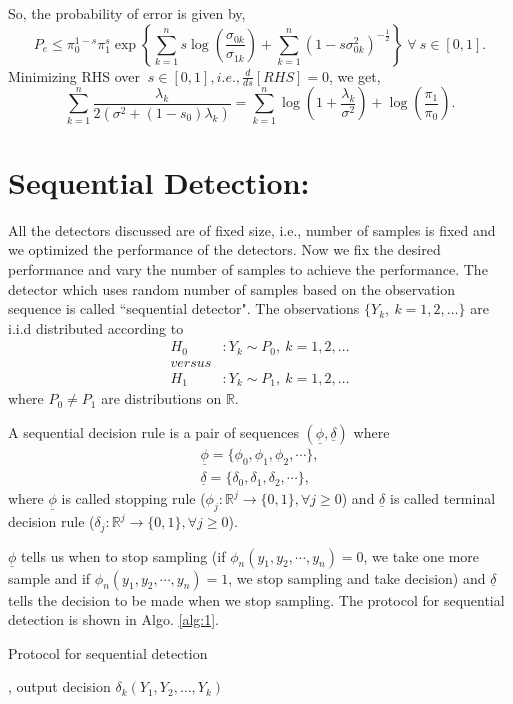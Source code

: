 \documentclass[a4paper,english,12pt]{article}
\newcommand{\uphi}{\underline{\phi}}
\newcommand{\udel}{\underline{\delta}}
\begin{document}
So, the probability of error is given by,
\begin{equation}
P_e \leq \pi_0^{1-s}\pi_1^{s}\exp\left\lbrace\sum_{k=1}^{n}s\log\left(\frac{\sigma_{0k}}{\sigma_{1k}} \right) + \sum_{k=1}^{n}\left( 1-s\sigma_{0k}^2\right)^{-\frac{1}{2}} \right\rbrace \;\forall \:s\in\left[ 0,1\right].
\end{equation}
Minimizing RHS over $\:s\in[0,1], i.e., \frac{d}{ds}[RHS]=0$, we get,
\begin{equation}
\sum_{k=1}^{n}\frac{\lambda_k}{2\left(\sigma^{2} +(1-s_0)\lambda_k\right)}=\sum_{k=1}^{n}\log\left(1+\frac{\lambda_k}{\sigma^2} \right)+\log\left(\frac{\pi_1}{\pi_0} \right).
\end{equation}
\section{Sequential Detection:}
All the detectors discussed are of fixed size, i.e., number of samples is fixed and we optimized the performance of the detectors. Now we fix the desired performance and vary the number of samples to achieve the performance. The detector which uses random number of samples based on the observation sequence is called ``sequential detector". The observations $\{Y_k,~k=1,2,\dots\}$ are i.i.d distributed according to 
\begin{align*}
H_0 &: Y_k\sim P_0,~k=1,2,\dots\\
versus\\
H_1 &: Y_k\sim {P}_1,~k=1,2,\dots
\end{align*}
where $P_0\neq P_1$ are distributions on $\mathbb{R}$.
\begin{defn}
A sequential decision rule is a pair of sequences $(\uphi,\udel)$ where
\begin{eqnarray*}
\uphi=\{\phi_0,\phi_1,\phi_2,\cdots\},\\
\udel=\{\delta_0,\delta_1,\delta_2,\cdots\},
\end{eqnarray*}
where $\uphi$ is called stopping rule ($\phi_j:\mathbb{R}^j \rightarrow \{0,1\}, \forall j\geq 0$) and $\udel$ is called terminal decision rule ($\delta_j:\mathbb{R}^j \rightarrow \{0,1\}, \forall j\geq 0$). 
\end{defn}
$\uphi$ tells us when to stop sampling (if $\phi_n(y_1,y_2,\cdots,y_n)=0$, we take one more sample and if $\phi_n(y_1,y_2,\cdots,y_n)=1$, we stop sampling and take decision) and $\udel$ tells the decision to be made when we stop sampling. The protocol for sequential detection is shown in Algo. \ref{alg:1}.
\begin{algorithm}[h]
\caption{Protocol for sequential detection}\label{alg:1}
\begin{algorithmic}[1]
	,
	\State output decision  $\delta_k(Y_1,Y_2,\dots,Y_k)$
	\EndIf
\EndFor 
\end{algorithmic}
\end{algorithm}
\end{document}
